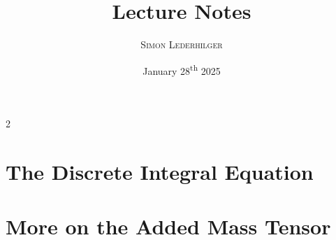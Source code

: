 \documentclass{article}
\title{Lecture Notes}
\subtitle{\textit{\headcourse}}
\author{\textsc{Simon Lederhilger}}
\date{January 28\textsuperscript{th} 2025}
\begin{document}
\maketitle\thispagestyle{fancy}
\begin{multicols*}{2}
    \section[Discrete Integral Eq.]{The Discrete Integral Equation}
    \begingroup\endgroup

    \section[Added Mass]{More on the Added Mass Tensor}
    \begingroup\endgroup

    \printbibliography
\end{multicols*}
\end{document}
